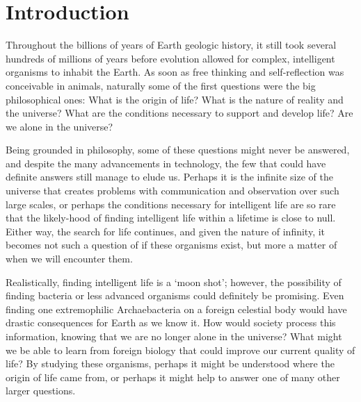 \chapter{Introduction} %
    


Throughout the billions of years of Earth geologic history, it still took several hundreds of millions of years before evolution allowed for complex, intelligent organisms to inhabit the Earth. As soon as free thinking and self-reflection was conceivable in animals, naturally some of the first questions were the big philosophical ones: What is the origin of life? What is the nature of reality and the universe? What are the conditions necessary to support and develop life? Are we alone in the universe?

Being grounded in philosophy, some of these questions might never be answered, and despite the many advancements in technology, the few that could have definite answers still manage to elude us. Perhaps it is the infinite size of the universe that creates problems with communication and observation over such large scales, or perhaps the conditions necessary for intelligent life are so rare that the likely-hood of finding intelligent life within a lifetime is close to null. Either way, the search for life continues, and given the nature of infinity, it becomes not such a question of if these organisms exist, but more a matter of when we will encounter them.

Realistically, finding intelligent life is a `moon shot'; however, the possibility of finding bacteria or less advanced organisms could definitely be promising. Even finding one extremophilic Archaebacteria on a foreign celestial body would have drastic consequences for Earth as we know it. How would society process this information, knowing that we are no longer alone in the universe? What might we be able to learn from foreign biology that could improve our current quality of life? By studying these organisms, perhaps it might be understood where the origin of life came from, or perhaps it might help to answer one of many other larger questions.

